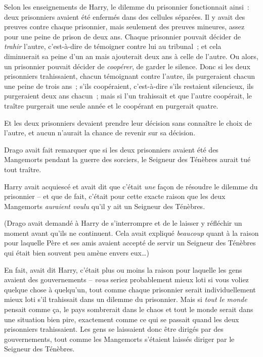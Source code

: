 Selon les enseignements de Harry, le dilemme du prisonnier fonctionnait ainsi~: deux prisonniers avaient été enfermés dans des cellules séparées. Il y avait des preuves contre chaque prisonnier, mais seulement des preuves mineures, assez pour une peine de prison de deux ans. Chaque prisonnier pouvait décider de \emph{trahir} l'autre, c'est-à-dire de témoigner contre lui au tribunal~; et cela diminuerait sa peine d'un an mais ajouterait deux ans à celle de l'autre. Ou alors, un prisonnier pouvait décider de \emph{coopérer}, de garder le silence. Donc si les deux prisonniers trahissaient, chacun témoignant contre l'autre, ils purgeraient chacun une peine de trois ans~; s'ils coopéraient, c'est-à-dire s'ils restaient silencieux, ils purgeraient deux ans chacun~; mais si l'un trahissait et que l'autre coopérait, le traître purgerait une seule année et le coopérant en purgerait quatre.

Et les deux prisonniers devaient prendre leur décision sans connaître le choix de l'autre, et aucun n'aurait la chance de revenir sur sa décision.

Drago avait fait remarquer que si les deux prisonniers avaient été des Mangemorts pendant la guerre des sorciers, le Seigneur des Ténèbres aurait tué tout traître.

Harry avait acquiescé et avait dit que c'était \emph{une} façon de résoudre le dilemme du prisonnier -- et que de fait, c'était pour cette exacte raison que les deux Mangemorts \emph{auraient voulu} qu'il y ait un Seigneur des Ténèbres.

(Drago avait demandé à Harry de s'interrompre et de le laisser y réfléchir un moment avant qu'ils ne continuent. Cela avait expliqué \emph{beaucoup} quant à la raison pour laquelle Père et ses amis avaient accepté de servir un Seigneur des Ténèbres qui était bien souvent peu amène envers eux…)

En fait, avait dit Harry, c'était plus ou moins la raison pour laquelle les gens avaient des gouvernements -- \emph{vous} seriez probablement mieux loti si vous voliez quelque chose à quelqu'un, tout comme chaque prisonnier serait individuellement mieux loti s'il trahissait dans un dilemme du prisonnier. Mais si \emph{tout le monde} pensait comme ça, le pays sombrerait dans le chaos et tout le monde serait dans une situation bien pire, exactement comme ce qui se passait quand les deux prisonniers trahissaient. Les gens se laissaient donc être dirigés par des gouvernements, tout comme les Mangemorts s'étaient laissés diriger par le Seigneur des Ténèbres.

